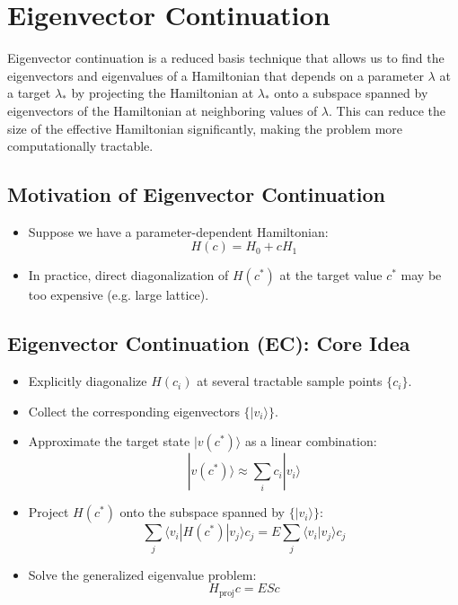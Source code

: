 \section{Eigenvector Continuation}
Eigenvector continuation is a reduced basis technique that allows us to find the eigenvectors and eigenvalues of a Hamiltonian that depends on a parameter $\lambda$ at a target $\lambda_*$ by projecting the Hamiltonian at $\lambda_*$ onto a subspace spanned by eigenvectors of the Hamiltonian at neighboring values of $\lambda$. This can reduce the size of the effective Hamiltonian significantly, making the problem more computationally tractable.
\subsection{Motivation of Eigenvector Continuation}
\begin{itemize}
	\item Suppose we have a parameter-dependent Hamiltonian:
	\[
	H(c) = H_0 + c H_1
	\]
	\item In practice, direct diagonalization of $H(c^*)$ at the target value $c^*$ may be too expensive (e.g. large lattice).
\end{itemize}

\subsection{Eigenvector Continuation (EC): Core Idea}
\begin{itemize}
	\setlength{\itemsep}{5pt}
	\item Explicitly diagonalize $H(c_i)$ at several tractable sample points $\{c_i\}$.
	\item Collect the corresponding eigenvectors $\{ |v_i\rangle \}$.
	\item Approximate the target state $|v(c^*)\rangle$ as a linear combination:
	\[
	|v(c^*)\rangle \approx \sum_i c_i |v_i\rangle
	\]
	\item Project $H(c^*)$ onto the subspace spanned by $\{ |v_i\rangle \}$:
	\[
	\sum_j \langle v_i|H(c^*)|v_j\rangle c_j 
	= E \sum_j \langle v_i|v_j\rangle c_j
	\]
	\item Solve the generalized eigenvalue problem:
	\[
	H_{\text{proj}} c = E S c
	\]
\end{itemize}

